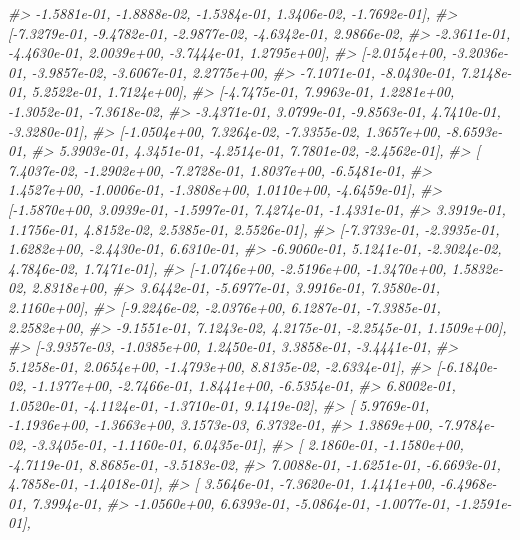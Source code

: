 \documentclass[]{book}
\newenvironment{Shaded}{\begin{snugshade}}{\end{snugshade}}
\newcommand{\CommentTok}[1]{\textcolor[rgb]{0.56,0.35,0.01}{\textit{#1}}}
\begin{document}
\begin{Shaded}
\begin{Highlighting}[]
\CommentTok{#>          -1.5881e-01, -1.8888e-02, -1.5384e-01,  1.3406e-02, -1.7692e-01],}
\CommentTok{#>         [-7.3279e-01, -9.4782e-01, -2.9877e-02, -4.6342e-01,  2.9866e-02,}
\CommentTok{#>          -2.3611e-01, -4.4630e-01,  2.0039e+00, -3.7444e-01,  1.2795e+00],}
\CommentTok{#>         [-2.0154e+00, -3.2036e-01, -3.9857e-02, -3.6067e-01,  2.2775e+00,}
\CommentTok{#>          -7.1071e-01, -8.0430e-01,  7.2148e-01,  5.2522e-01,  1.7124e+00],}
\CommentTok{#>         [-4.7475e-01,  7.9963e-01,  1.2281e+00, -1.3052e-01, -7.3618e-02,}
\CommentTok{#>          -3.4371e-01,  3.0799e-01, -9.8563e-01,  4.7410e-01, -3.3280e-01],}
\CommentTok{#>         [-1.0504e+00,  7.3264e-02, -7.3355e-02,  1.3657e+00, -8.6593e-01,}
\CommentTok{#>           5.3903e-01,  4.3451e-01, -4.2514e-01,  7.7801e-02, -2.4562e-01],}
\CommentTok{#>         [ 7.4037e-02, -1.2902e+00, -7.2728e-01,  1.8037e+00, -6.5481e-01,}
\CommentTok{#>           1.4527e+00, -1.0006e-01, -1.3808e+00,  1.0110e+00, -4.6459e-01],}
\CommentTok{#>         [-1.5870e+00,  3.0939e-01, -1.5997e-01,  7.4274e-01, -1.4331e-01,}
\CommentTok{#>           3.3919e-01,  1.1756e-01,  4.8152e-02,  2.5385e-01,  2.5526e-01],}
\CommentTok{#>         [-7.3733e-01, -2.3935e-01,  1.6282e+00, -2.4430e-01,  6.6310e-01,}
\CommentTok{#>          -6.9060e-01,  5.1241e-01, -2.3024e-02,  4.7846e-02,  1.7471e-01],}
\CommentTok{#>         [-1.0746e+00, -2.5196e+00, -1.3470e+00,  1.5832e-02,  2.8318e+00,}
\CommentTok{#>           3.6442e-01, -5.6977e-01,  3.9916e-01,  7.3580e-01,  2.1160e+00],}
\CommentTok{#>         [-9.2246e-02, -2.0376e+00,  6.1287e-01, -7.3385e-01,  2.2582e+00,}
\CommentTok{#>          -9.1551e-01,  7.1243e-02,  4.2175e-01, -2.2545e-01,  1.1509e+00],}
\CommentTok{#>         [-3.9357e-03, -1.0385e+00,  1.2450e-01,  3.3858e-01, -3.4441e-01,}
\CommentTok{#>           5.1258e-01,  2.0654e+00, -1.4793e+00,  8.8135e-02, -2.6334e-01],}
\CommentTok{#>         [-6.1840e-02, -1.1377e+00, -2.7466e-01,  1.8441e+00, -6.5354e-01,}
\CommentTok{#>           6.8002e-01,  1.0520e-01, -4.1124e-01, -1.3710e-01,  9.1419e-02],}
\CommentTok{#>         [ 5.9769e-01, -1.1936e+00, -1.3663e+00,  3.1573e-03,  6.3732e-01,}
\CommentTok{#>           1.3869e+00, -7.9784e-02, -3.3405e-01, -1.1160e-01,  6.0435e-01],}
\CommentTok{#>         [ 2.1860e-01, -1.1580e+00, -4.7119e-01,  8.8685e-01, -3.5183e-02,}
\CommentTok{#>           7.0088e-01, -1.6251e-01, -6.6693e-01,  4.7858e-01, -1.4018e-01],}
\CommentTok{#>         [ 3.5646e-01, -7.3620e-01,  1.4141e+00, -6.4968e-01,  7.3994e-01,}
\CommentTok{#>          -1.0560e+00,  6.6393e-01, -5.0864e-01, -1.0077e-01, -1.2591e-01],}

\end{Highlighting}
\end{Shaded}
\end{document}

